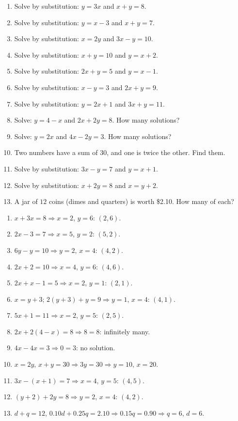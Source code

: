 \documentclass[11pt]{article}
\begin{document}
\begin{recapbox}
\begin{multicols}{2}
\small
\begin{enumerate}[leftmargin=*,itemsep=3pt]
  \item Solve by substitution: $y=3x$ and $x+y=8$.
  \item Solve by substitution: $y=x-3$ and $x+y=7$.
  \item Solve by substitution: $x=2y$ and $3x-y=10$.
  \item Solve by substitution: $x+y=10$ and $y=x+2$.
  \item Solve by substitution: $2x+y=5$ and $y=x-1$.
  \item Solve by substitution: $x-y=3$ and $2x+y=9$.
  \item Solve by substitution: $y=2x+1$ and $3x+y=11$.
  \item Solve: $y=4-x$ and $2x+2y=8$. How many solutions?
  \item Solve: $y=2x$ and $4x-2y=3$. How many solutions?
  \item Two numbers have a sum of $30$, and one is twice the other. Find them.
  \item Solve by substitution: $3x-y=7$ and $y=x+1$.
  \item Solve by substitution: $x+2y=8$ and $x=y+2$.
  \item A jar of $12$ coins (dimes and quarters) is worth \$2.10. How many of each?
\end{enumerate}
\end{multicols}
\end{recapbox}

\begin{keybox}
\begin{multicols}{2}
\small
\begin{enumerate}[leftmargin=*,itemsep=3pt]
  \item $x+3x=8\Rightarrow x=2$, $y=6$: $(2,6)$.
  \item $2x-3=7\Rightarrow x=5$, $y=2$: $(5,2)$.
  \item $6y-y=10\Rightarrow y=2$, $x=4$: $(4,2)$.
  \item $2x+2=10\Rightarrow x=4$, $y=6$: $(4,6)$.
  \item $2x+x-1=5\Rightarrow x=2$, $y=1$: $(2,1)$.
  \item $x=y+3$; $2(y+3)+y=9\Rightarrow y=1$, $x=4$: $(4,1)$.
  \item $5x+1=11\Rightarrow x=2$, $y=5$: $(2,5)$.
  \item $2x+2(4-x)=8\Rightarrow 8=8$: infinitely many.
  \item $4x-4x=3\Rightarrow 0=3$: no solution.
  \item $x=2y$, $x+y=30\Rightarrow 3y=30\Rightarrow y=10$, $x=20$.
  \item $3x-(x+1)=7\Rightarrow x=4$, $y=5$: $(4,5)$.
  \item $(y+2)+2y=8\Rightarrow y=2$, $x=4$: $(4,2)$.
  \item $d+q=12$, $0.10d+0.25q=2.10\Rightarrow 0.15q=0.90\Rightarrow q=6$, $d=6$.
\end{enumerate}
\end{multicols}
\end{keybox}
\end{document}
